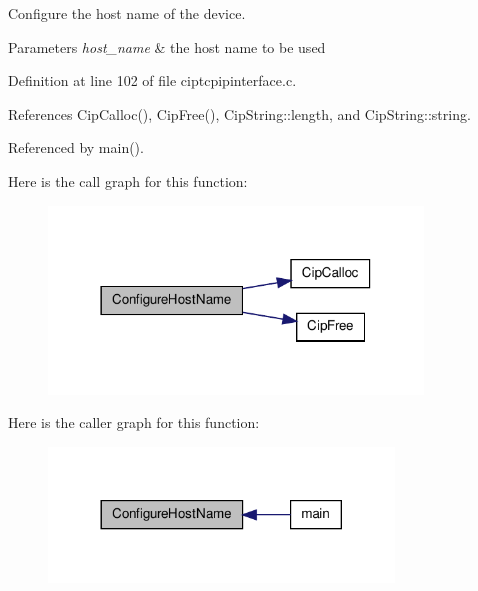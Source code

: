 \-Configure the host name of the device. 


\begin{DoxyParams}{\-Parameters}
{\em host\-\_\-name} & the host name to be used \\
\hline
\end{DoxyParams}


\-Definition at line 102 of file ciptcpipinterface.\-c.



\-References \-Cip\-Calloc(), \-Cip\-Free(), \-Cip\-String\-::length, and \-Cip\-String\-::string.



\-Referenced by main().



\-Here is the call graph for this function\-:
\nopagebreak
\begin{figure}[H]
\begin{center}
\leavevmode
\includegraphics[width=282pt]{d2/dc9/group__CIP__API_gab4a2d826ebe9be1b60c0206414a8f8ce_cgraph}
\end{center}
\end{figure}




\-Here is the caller graph for this function\-:
\nopagebreak
\begin{figure}[H]
\begin{center}
\leavevmode
\includegraphics[width=260pt]{d2/dc9/group__CIP__API_gab4a2d826ebe9be1b60c0206414a8f8ce_icgraph}
\end{center}
\end{figure}



